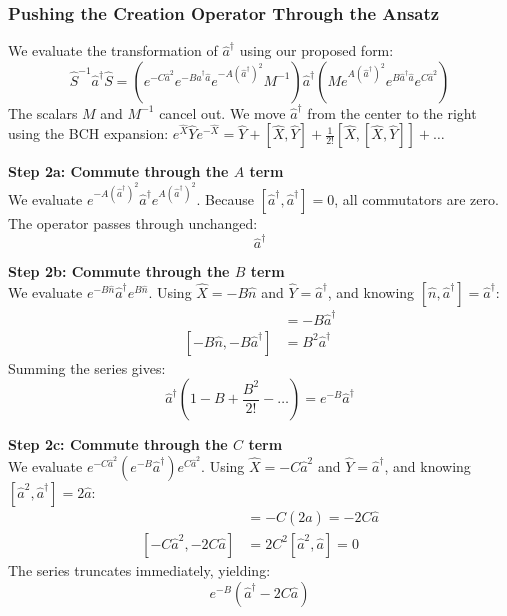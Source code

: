 {\subsubsection{Pushing the Creation Operator Through the Ansatz}
We evaluate the transformation of $\hat{a}^\dagger$ using our proposed form:
\begin{equation*}
\hat{S}^{-1} \hat{a}^\dagger \hat{S} = \left(e^{-C\hat{a}^2} e^{-B\hat{a}^\dagger\hat{a}} e^{-A(\hat{a}^\dagger)^2} M^{-1}\right) \hat{a}^\dagger \left(M e^{A(\hat{a}^\dagger)^2} e^{B\hat{a}^\dagger\hat{a}} e^{C\hat{a}^2}\right)
\end{equation*}
The scalars $M$ and $M^{-1}$ cancel out. We move $\hat{a}^\dagger$ from the center to the right using the BCH expansion: $e^{\hat{X}}\hat{Y}e^{-\hat{X}} = \hat{Y} + [\hat{X},\hat{Y}] + \frac{1}{2!}[\hat{X},[\hat{X},\hat{Y}]] + \dots$

\textbf{Step 2a: Commute through the $A$ term} \\
We evaluate $e^{-A(\hat{a}^\dagger)^2} \hat{a}^\dagger e^{A(\hat{a}^\dagger)^2}$. Because $[\hat{a}^\dagger, \hat{a}^\dagger] = 0$, all commutators are zero. The operator passes through unchanged:
\begin{equation*}
\hat{a}^\dagger
\end{equation*}

\textbf{Step 2b: Commute through the $B$ term} \\
We evaluate $e^{-B\hat{n}} \hat{a}^\dagger e^{B\hat{n}}$. Using $\hat{X} = -B\hat{n}$ and $\hat{Y} = \hat{a}^\dagger$, and knowing $[\hat{n}, \hat{a}^\dagger] = \hat{a}^\dagger$:
\begin{align*}
[-B\hat{n}, \hat{a}^\dagger] &= -B\hat{a}^\dagger \\
[-B\hat{n}, -B\hat{a}^\dagger] &= B^2\hat{a}^\dagger
\end{align*}
Summing the series gives:
\begin{equation*}
\hat{a}^\dagger\left(1 - B + \frac{B^2}{2!} - \dots\right) = e^{-B}\hat{a}^\dagger
\end{equation*}

\textbf{Step 2c: Commute through the $C$ term} \\
We evaluate $e^{-C\hat{a}^2} (e^{-B}\hat{a}^\dagger) e^{C\hat{a}^2}$. Using $\hat{X} = -C\hat{a}^2$ and $\hat{Y} = \hat{a}^\dagger$, and knowing $[\hat{a}^2, \hat{a}^\dagger] = 2\hat{a}$:
\begin{align*}
[-C\hat{a}^2, \hat{a}^\dagger] &= -C(2\hat{a}) = -2C\hat{a} \\
[-C\hat{a}^2, -2C\hat{a}] &= 2C^2[\hat{a}^2, \hat{a}] = 0
\end{align*}
The series truncates immediately, yielding:
\begin{equation*}
e^{-B}(\hat{a}^\dagger - 2C\hat{a})
\end{equation*}

}
